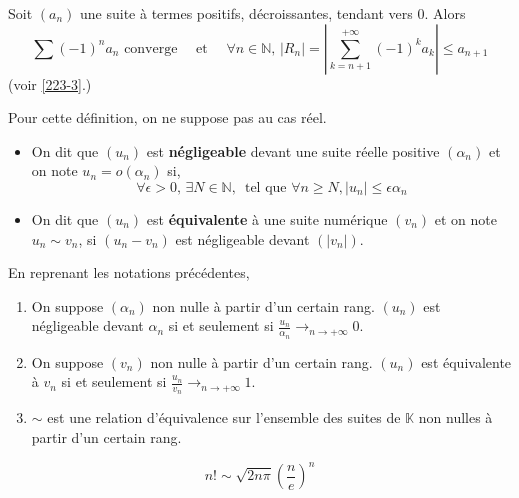 
  \begin{application}
    Soit $(a_n)$ une suite à termes positifs, décroissantes, tendant vers $0$. Alors
    \[ \sum (-1)^n a_n \text{ converge} \quad \text{ et } \quad \forall n \in \mathbb{N}, \, |R_n| = \left| \sum_{k=n+1}^{+\infty} (-1)^k a_k \right| \leq a_{n+1} \]
    (voir \cref{223-3}.)
  \end{application}


  \begin{definition}
    Pour cette définition, on ne suppose pas au cas réel.
    \begin{itemize}
      \item On dit que $(u_n)$ est \textbf{négligeable} devant une suite réelle positive $(\alpha_n)$ et on note $u_n = o(\alpha_n)$ si,
      \[ \forall \epsilon > 0, \, \exists N \in \mathbb{N}, \, \text{ tel que } \forall n \geq N, \vert u_n \vert \leq \epsilon \alpha_n  \]
      \item On dit que $(u_n)$ est \textbf{équivalente} à une suite numérique $(v_n)$ et on note $u_n \sim v_n$, si $(u_n - v_n)$ est négligeable devant $(\vert v_n \vert)$.
    \end{itemize}
  \end{definition}

  \begin{proposition}
    En reprenant les notations précédentes,
    \begin{enumerate}[label={\bfseries(\roman*)}]
      \item On suppose $(\alpha_n)$ non nulle à partir d'un certain rang. $(u_n)$ est négligeable devant $\alpha_n$ si et seulement si $\frac{u_n}{\alpha_n} \longrightarrow_{n \rightarrow +\infty} 0$.
      \item On suppose $(v_n)$ non nulle à partir d'un certain rang. $(u_n)$ est équivalente à $v_n$ si et seulement si $\frac{u_n}{v_n} \longrightarrow_{n \rightarrow +\infty} 1$.
      \item $\sim$ est une relation d'équivalence sur l'ensemble des suites de $\mathbb{K}$ non nulles à partir d'un certain rang.
    \end{enumerate}
  \end{proposition}


  \begin{example}
    \[ n! \sim \sqrt{2n\pi} \left( \frac{n}{e} \right)^n \]
  \end{example}

